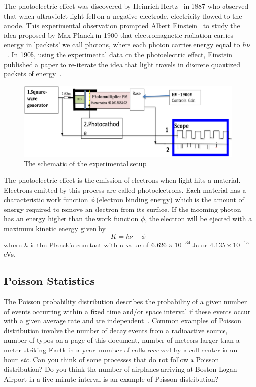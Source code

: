 \documentclass[10pt,aps,twocolumn,secnumarabic,balancelastpage,amsmath,amssymb,nofootinbib,floatfix]{revtex4}
\begin{document}
The photoelectric effect was discovered by Heinrich Hertz~\cite{buchwald1994} in 1887 who observed that when ultraviolet light fell on a negative electrode, electricity flowed to the anode. This experimental observation prompted Albert Einstein~\cite{einstein1905} to study the idea proposed by Max Planck in 1900 that electromagnetic radiation carries energy in 'packets' we call photons, where each photon carries energy equal to $h\nu$~\cite{planck1900}. In 1905, using the experimental data on the photoelectric effect, Einstein published a paper to re-iterate the idea that light travels in discrete quantized packets of energy~\cite{einstein1905}. 

\begin{figure}
  \centering
  \includegraphics[width=1.0\linewidth]{figs/apparatus1.png}
  \caption{The schematic of the experimental setup}
  \label{fig:apparatus1}
\end{figure}

The photoelectric effect is the emission of electrons when light hits a material. Electrons emitted by this process are called photoelectrons. Each material has a characteristic work function $\phi$ (electron binding energy) which is the amount of energy required to remove an electron from its surface. If the incoming photon has an energy higher than the work function $\phi$, the electron will be ejected with a maximum kinetic energy given by
\begin{equation}
  K = h\nu - \phi
\end{equation}
where $h$ is the Planck's constant with a value of $6.626\times10^{-34}$ Js or $4.135\times10^{-15}$ eVs.

\subsection{Poisson Statistics}

The Poisson probability distribution describes the probability of a given number of events occurring within a fixed time and/or space interval if these events occur with a given average rate and are independent~\cite{WP-poisson-distribution}. Common examples of Poisson distribution involve the number of decay events from a radioactive source, number of typos on a page of this document, number of meteors larger than a meter striking Earth in a year, number of calls received by a call center in an hour {\it etc.} Can you think of some processes that do not follow a Poisson distribution? Do you think the number of airplanes arriving at Boston Logan Airport in a five-minute interval is an example of Poisson distribution? 
\end{document}
